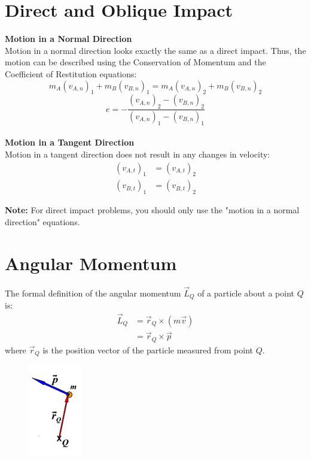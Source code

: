 \documentclass{article}
\begin{document}
\section*{Direct and Oblique Impact}

\textbf{Motion in a Normal Direction} \\
Motion in a normal direction looks exactly the same as a direct impact. Thus, the motion can be described using the Conservation of Momentum and the Coefficient of Restitution equations:
\begin{equation*}
    m_A \left(v_{A, n} \right)_1 + m_B \left( v_{B, n} \right)_1 = m_A \left(v_{A, n} \right)_2 + m_B \left( v_{B, n} \right)_2
\end{equation*}
\begin{equation*}
    e = -\frac{\left(v_{A, n} \right)_2 - \left( v_{B, n} \right)_2}{\left(v_{A, n} \right)_1 - \left( v_{B, n} \right)_1}
\end{equation*} \\

\textbf{Motion in a Tangent Direction} \\
Motion in a tangent direction does not result in any changes in velocity:
\begin{align*}
    \left(v_{A, t} \right)_1 &= \left(v_{A, t} \right)_2 \\
    \left(v_{B, t} \right)_1 &= \left(v_{B, t} \right)_2
\end{align*}

\textbf{Note:} For direct impact problems, you should only use the "motion in a normal direction" equations.

\clearpage


\section*{Angular Momentum}

The formal definition of the angular momentum $\vec{L}_Q$ of a particle about a point $Q$ is:
\begin{align*}
    \vec{L}_Q &= \vec{r}_Q \times \left( m \vec{v} \right) \\
              &= \vec{r}_Q \times \vec{p}
\end{align*}
where $\vec{r}_Q$ is the position vector of the particle measured from point $Q$.

\begin{figure}[h]
    \includegraphics[scale=0.7]{angular_momentum_no_text}
    \centering
\end{figure}
\end{document}
